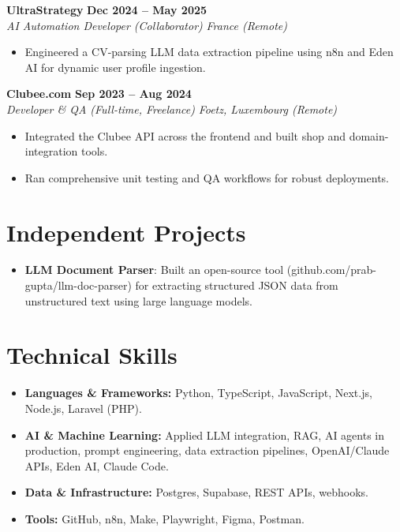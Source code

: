 \documentclass[11pt,a4paper]{article}
\begin{document}
\noindent \textbf{UltraStrategy} \hfill \textbf{Dec 2024 -- May 2025} \\
\textit{AI Automation Developer (Collaborator)} \hfill \textit{France (Remote)}
\begin{itemize}[leftmargin=*,itemsep=2pt]
    \item Engineered a CV-parsing LLM data extraction pipeline using n8n and Eden AI for dynamic user profile ingestion.
\end{itemize}

\noindent \textbf{Clubee.com} \hfill \textbf{Sep 2023 -- Aug 2024} \\
\textit{Developer \& QA (Full-time, Freelance)} \hfill \textit{Foetz, Luxembourg (Remote)}
\begin{itemize}[leftmargin=*,itemsep=2pt]
    \item Integrated the Clubee API across the frontend and built shop and domain-integration tools.
    \item Ran comprehensive unit testing and QA workflows for robust deployments.
\end{itemize}

\section{Independent Projects}
\begin{itemize}[leftmargin=*,itemsep=2pt]
    \item \textbf{LLM Document Parser}: Built an open-source tool (github.com/prab-gupta/llm-doc-parser) for extracting structured JSON data from unstructured text using large language models.
\end{itemize}

\section{Technical Skills}
\begin{itemize}[leftmargin=*,itemsep=2pt]
    \item \textbf{Languages \& Frameworks:} Python, TypeScript, JavaScript, Next.js, Node.js, Laravel (PHP).
    \item \textbf{AI \& Machine Learning:} Applied LLM integration, RAG, AI agents in production, prompt engineering, data extraction pipelines, OpenAI/Claude APIs, Eden AI, Claude Code.
    \item \textbf{Data \& Infrastructure:} Postgres, Supabase, REST APIs, webhooks.
    \item \textbf{Tools:} GitHub, n8n, Make, Playwright, Figma, Postman.
\end{itemize}
\end{document}
